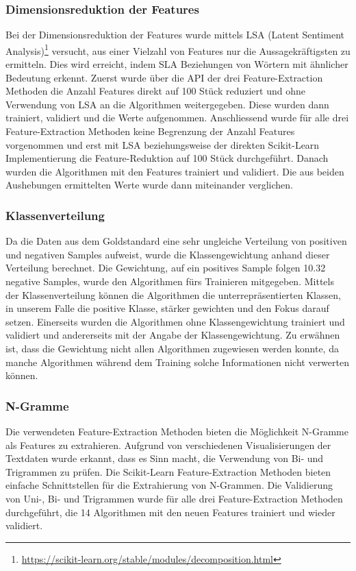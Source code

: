 \subsubsection{Dimensionsreduktion der Features}
Bei der Dimensionsreduktion der Features wurde mittels LSA (Latent Sentiment Analysis)\footnote{\url{https://scikit-learn.org/stable/modules/decomposition.html}} versucht, aus einer Vielzahl von Features nur die Aussagekräftigsten zu ermitteln.
Dies wird erreicht, indem SLA Beziehungen von Wörtern mit ähnlicher Bedeutung erkennt.
Zuerst wurde über die API der drei Feature-Extraction Methoden die Anzahl Features direkt auf 100 Stück reduziert und ohne Verwendung von LSA an die Algorithmen weitergegeben.
Diese wurden dann trainiert, validiert und die Werte aufgenommen.
Anschliessend wurde für alle drei Feature-Extraction Methoden keine Begrenzung der Anzahl Features vorgenommen und erst mit LSA beziehungsweise der direkten Scikit-Learn Implementierung \glqqTruncatedSVD\grqq{} die Feature-Reduktion auf 100 Stück durchgeführt.
Danach wurden die Algorithmen mit den Features trainiert und validiert.
Die aus beiden Aushebungen ermittelten Werte wurde dann miteinander verglichen.
\subsubsection{Klassenverteilung}
Da die Daten aus dem Goldstandard eine sehr ungleiche Verteilung von positiven und negativen Samples aufweist, wurde die Klassengewichtung anhand dieser Verteilung berechnet.
Die Gewichtung, auf ein positives Sample folgen 10.32 negative Samples, wurde den Algorithmen fürs Trainieren mitgegeben.
Mittels der Klassenverteilung können die Algorithmen die unterrepräsentierten Klassen, in unserem Falle die positive Klasse, stärker gewichten und den Fokus darauf setzen.
Einerseits wurden die Algorithmen ohne Klassengewichtung trainiert und validiert und andererseits mit der Angabe der Klassengewichtung.
Zu erwähnen ist, dass die Gewichtung nicht allen Algorithmen zugewiesen werden konnte, da manche Algorithmen während dem Training solche Informationen nicht verwerten können.
\subsubsection{N-Gramme}
Die verwendeten Feature-Extraction Methoden bieten die Möglichkeit N-Gramme als Features zu extrahieren.
Aufgrund von verschiedenen Visualisierungen der Textdaten wurde erkannt, dass es Sinn macht, die Verwendung von Bi- und Trigrammen zu prüfen.
Die Scikit-Learn Feature-Extraction Methoden bieten einfache Schnittstellen für die Extrahierung von N-Grammen.
Die Validierung von Uni-, Bi- und Trigrammen wurde für alle drei Feature-Extraction Methoden durchgeführt, die 14 Algorithmen mit den neuen Features trainiert und wieder validiert.
